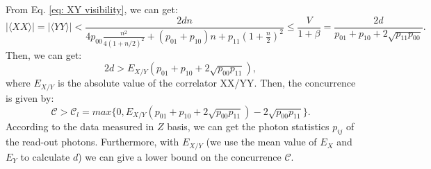 \documentclass[aps,reprint,showpacs,superscriptaddress]{revtex4-2}
\begin{document}
From Eq. \ref{eq: XY visibility}, we can get:
\begin{equation}
	|\langle XX\rangle|=|\langle YY\rangle|<\frac{2dn}{4p_{00}\frac{n^2}{4(1+n/2)^2}+(p_{01}+p_{10})n+p_{11}(1+\frac{n}{2})^2}\le \frac{V}{1+\beta}=\frac{2d}{p_{01}+p_{10}+2\sqrt{p_{11}p_{00}}}.
	\label{eq: XY bound}
\end{equation}
Then, we can get:
\begin{equation}
	2d>E_{X/Y}(p_{01}+p_{10}+2\sqrt{p_{00}p_{11}}),
\end{equation}
where $E_{X/Y}$ is the absolute value of the correlator XX/YY. Then, the concurrence is  given by:
\begin{equation}
	\mathcal{C}>\mathcal{C}_l=max\{0,E_{X/Y}(p_{01}+p_{10}+2\sqrt{p_{00}p_{11}})-2\sqrt{p_{00}p_{11}}\}.
\end{equation}
According to the data measured in $Z$ basis, we can get the photon statistics $p_{ij}$ of the read-out photons. Furthermore, with $E_{X/Y}$ (we use the mean value of $E_X$ and $E_Y$ to calculate $d$) we can give a lower bound on the concurrence $\mathcal{C}$. 
\end{document}
